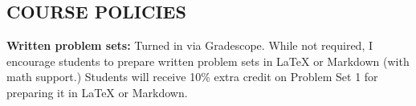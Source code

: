 \documentclass[10pt]{article}
\begin{document}
%	
%	



\subsection{COURSE POLICIES}
\medskip\noindent\textbf{Written problem sets:} Turned in via Gradescope. While not required, I encourage students to prepare written problem sets in LaTeX or Markdown (with math support.) Students will receive 10\% extra credit on Problem Set 1 for preparing it in LaTeX or Markdown. 
\end{document}
